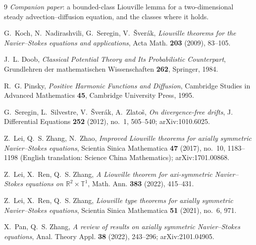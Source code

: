 \documentclass[11pt]{article}
\theoremstyle{definition}
\newcommand{\R}{\mathbb{R}}
\begin{document}
\begin{thebibliography}{9}
\emph{Companion paper}: a bounded-class Liouville lemma for a two-dimensional
steady advection--diffusion equation, and the classes where it holds.

G.~Koch, N.~Nadirashvili, G.~Seregin, V.~\v{S}ver\'ak,
\emph{Liouville theorems for the Navier--Stokes equations and applications},
Acta Math. \textbf{203} (2009), 83--105.

J.~L. Doob, \emph{Classical Potential Theory and Its Probabilistic
Counterpart}, Grundlehren der mathematischen Wissenschaften \textbf{262},
Springer, 1984.

R.~G. Pinsky, \emph{Positive Harmonic Functions and Diffusion},
Cambridge Studies in Advanced Mathematics \textbf{45}, Cambridge University
Press, 1995.

G.~Seregin, L.~Silvestre, V.~\v{S}ver\'ak, A.~Zlato\v{s}, \emph{On
divergence-free drifts}, J. Differential Equations \textbf{252} (2012), no.~1,
505--540; arXiv:1010.6025.

Z.~Lei, Q.~S. Zhang, N.~Zhao, \emph{Improved Liouville theorems for axially
symmetric Navier--Stokes equations}, Scientia Sinica Mathematica \textbf{47}
(2017), no.~10, 1183--1198 (English translation: Science China Mathematics);
arXiv:1701.00868.

Z.~Lei, X.~Ren, Q.~S. Zhang, \emph{A Liouville theorem for axi-symmetric
Navier--Stokes equations on $\R^2\times\mathbb{T}^1$}, Math. Ann.
\textbf{383} (2022), 415--431.

Z.~Lei, X.~Ren, Q.~S. Zhang, \emph{Liouville type theorems for axially symmetric
Navier--Stokes equations}, Scientia Sinica Mathematica \textbf{51} (2021), no.~6, 971.

X.~Pan, Q.~S. Zhang, \emph{A review of results on axially symmetric
Navier--Stokes equations}, Anal. Theory Appl. \textbf{38} (2022), 243--296;
arXiv:2101.04905.
\end{thebibliography}
\end{document}
